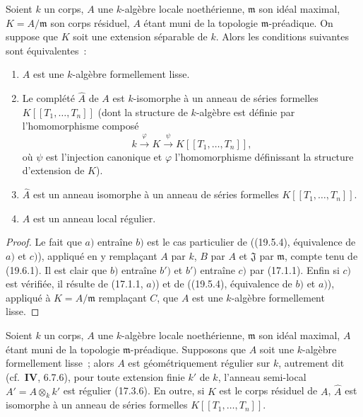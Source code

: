 \begin{theorem}[19.6.4]
\label{0.19.6.4-fr}
Soient $k$ un corps, $A$ une $k$-algèbre locale noethérienne, $\mathfrak m$ son
idéal maximal, $K=A/\mathfrak m$ son corps résiduel, $A$ étant muni de la
topologie $\mathfrak m$-préadique. On suppose que $K$ soit une extension
séparable de $k$. Alors les conditions suivantes sont équivalentes~:
\begin{enumerate}
  \item[a)] $A$ est une $k$-algèbre formellement lisse.
  \item[b)] Le complété $\widehat A$ de $A$ est $k$-isomorphe à un anneau de
  séries formelles $K[[T_1,\ldots,T_n]]$ (dont la structure de $k$-algèbre est
  définie par l'homomorphisme composé
  \[
    k\xrightarrow{\varphi}K\xrightarrow{\psi}K[[T_1,\ldots,T_n]],
  \]
  où $\psi$ est l'injection canonique et $\varphi$ l'homomorphisme définissant
  la structure d'extension de $K$).
  \item[b')] $\widehat A$ est un anneau isomorphe à un anneau de séries
  formelles $K[[T_1,\ldots,T_n]]$.
  \item[c)] $A$ est un anneau local régulier.
\end{enumerate}
\end{theorem}

\begin{proof}
Le fait que $a)$ entraîne $b)$ est le cas particulier de ((19.5.4),
équivalence de $a)$ et $c)$), appliqué en y remplaçant $A$ par $k$, $B$ par
$A$ et $\mathfrak J$ par $\mathfrak m$, compte tenu de (19.6.1). Il est clair
que $b)$ entraîne $b')$ et $b')$ entraîne $c)$ par (17.1.1). Enfin si $c)$ est
vérifiée, il résulte de (17.1.1, $a)$) et de ((19.5.4), équivalence de $b)$ et
$a)$), appliqué à $K=A/\mathfrak m$ remplaçant $C$, que $A$ est une
$k$-algèbre formellement lisse.
\end{proof}

\begin{corollary}[19.6.5]
\label{0.19.6.5-fr}
Soient $k$ un corps, $A$ une $k$-algèbre locale noethérienne, $\mathfrak m$ son
idéal maximal, $A$ étant muni de la topologie $\mathfrak m$-préadique.
Supposons que $A$ soit une $k$-algèbre formellement lisse~; alors $A$ est
géométriquement régulier sur $k$, autrement dit (cf.~$\mathbf{IV}$, 6.7.6),
pour toute extension finie $k'$ de $k$, l'anneau semi-local
$A'=A\otimes_k k'$ est régulier (17.3.6). En outre, si $K$ est le corps
résiduel de $A$, $\widehat A$ est isomorphe à un anneau de séries formelles
$K[[T_1,\ldots,T_n]]$.
\end{corollary}

